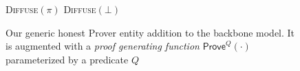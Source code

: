 \begin{figure}[t]
\begin{algorithm}[H]
    \caption{\label{alg.backbone-prover} Our generic honest Prover entity
        addition to the
        backbone model. It is augmented with a{ \em
        proof generating function} $\textsf{Prove}^Q(\cdot)$ parameterized by a
        predicate $Q$}
    \begin{algorithmic}[1]
     \Statex
     \Let\chain\varepsilon
                \State\textsc{Diffuse}{$(\pi)$}
            \Else
                \State\textsc{Diffuse}{$(\bot)$}
            \EndIf
        \EndWhile
        \vskip8pt
    \end{algorithmic}
\end{algorithm}
\end{figure}
